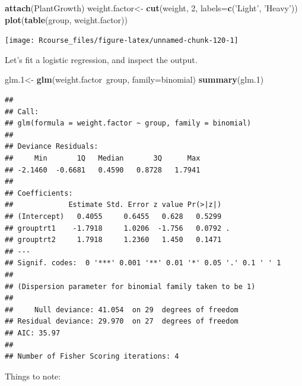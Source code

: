 \documentclass[]{book}
\newenvironment{Shaded}{\begin{snugshade}}{\end{snugshade}}
\newcommand{\KeywordTok}[1]{\textcolor[rgb]{0.13,0.29,0.53}{\textbf{{#1}}}}
\newcommand{\DataTypeTok}[1]{\textcolor[rgb]{0.13,0.29,0.53}{{#1}}}
\newcommand{\DecValTok}[1]{\textcolor[rgb]{0.00,0.00,0.81}{{#1}}}
\newcommand{\FloatTok}[1]{\textcolor[rgb]{0.00,0.00,0.81}{{#1}}}
\newcommand{\StringTok}[1]{\textcolor[rgb]{0.31,0.60,0.02}{{#1}}}
\newcommand{\NormalTok}[1]{{#1}}
\theoremstyle{definition}
\theoremstyle{definition}
\theoremstyle{remark}
\begin{document}
\begin{Shaded}
\begin{Highlighting}[]
\KeywordTok{attach}\NormalTok{(PlantGrowth)}
\NormalTok{weight.factor<-}\StringTok{ }\KeywordTok{cut}\NormalTok{(weight, }\DecValTok{2}\NormalTok{, }\DataTypeTok{labels=}\KeywordTok{c}\NormalTok{(}\StringTok{'Light'}\NormalTok{, }\StringTok{'Heavy'}\NormalTok{))}
\KeywordTok{plot}\NormalTok{(}\KeywordTok{table}\NormalTok{(group, weight.factor))}
\end{Highlighting}
\end{Shaded}

\texttt{[image: Rcourse\_files/figure-latex/unnamed-chunk-120-1]}

Let's fit a logistic regression, and inspect the output.

\begin{Shaded}
\begin{Highlighting}[]
\NormalTok{glm}\FloatTok{.1}\NormalTok{<-}\StringTok{ }\KeywordTok{glm}\NormalTok{(weight.factor~group, }\DataTypeTok{family=}\NormalTok{binomial)}
\KeywordTok{summary}\NormalTok{(glm}\FloatTok{.1}\NormalTok{)}
\end{Highlighting}
\end{Shaded}

\begin{verbatim}
## 
## Call:
## glm(formula = weight.factor ~ group, family = binomial)
## 
## Deviance Residuals: 
##     Min       1Q   Median       3Q      Max  
## -2.1460  -0.6681   0.4590   0.8728   1.7941  
## 
## Coefficients:
##             Estimate Std. Error z value Pr(>|z|)  
## (Intercept)   0.4055     0.6455   0.628   0.5299  
## grouptrt1    -1.7918     1.0206  -1.756   0.0792 .
## grouptrt2     1.7918     1.2360   1.450   0.1471  
## ---
## Signif. codes:  0 '***' 0.001 '**' 0.01 '*' 0.05 '.' 0.1 ' ' 1
## 
## (Dispersion parameter for binomial family taken to be 1)
## 
##     Null deviance: 41.054  on 29  degrees of freedom
## Residual deviance: 29.970  on 27  degrees of freedom
## AIC: 35.97
## 
## Number of Fisher Scoring iterations: 4
\end{verbatim}

Things to note:
\end{document}
